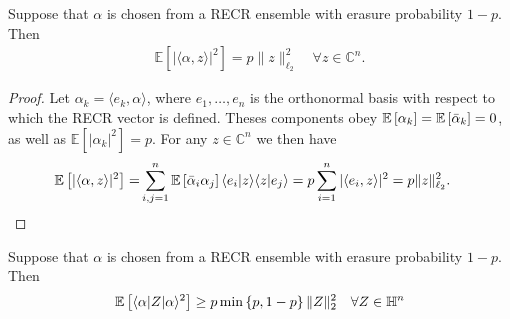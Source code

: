 \begin{lemma}
Suppose that $\alpha$ is chosen from a RECR ensemble with erasure probability $1-p$. Then
\begin{align}
  \mathbb{E} \left[ | \langle  \alpha, z \rangle|^2 \right] = p \|  z \|_{\ell_2}^2
  \quad \forall  z \in \mathbb{C}^n.
\end{align}
\end{lemma}

\begin{proof}
Let $\alpha_k = \langle  e_k, \alpha\rangle$, where $ e_1,\ldots, e_n$ is the orthonormal basis with respect to which the RECR vector is defined.
Theses components obey $\mathbb{E}\left[ \alpha_k \right] = \mathbb{E} \left[ \bar{\alpha}_k \right] = 0$, as well as $\mathbb{E} \left[ |\alpha_k|^2 \right] = p$.
For any $ z \in \mathbb{C}^n$ we then have
\begin{align}
  \mathbb{E} \left[| \langle  \alpha,  z\rangle |^2 \right]
  =& \sum_{i,j=1}^n \mathbb{E} \left[ \bar{\alpha}_i \alpha_j \right] \langle  e_i |  z \rangle \langle  z |  e_j \rangle = p \sum_{i=1}^n | \langle  e_i,  z \rangle|^2 = p \|  z \|_{\ell_2}^2.
\end{align}
\end{proof}

\begin{lemma}
  \label{lem:recr_subisotropic}
  Suppose that $\alpha$ is chosen from a RECR ensemble with erasure probability $1-p$. Then
  \[
  \mathbb{E} \left[ \langle  \alpha|  Z | \alpha \rangle^2 \right] \geq p \min \left\{ p, 1-p \right\} \|  Z \|_2^2 \quad \forall  Z \in \mathbb{H}^n
  \]
\end{lemma}

